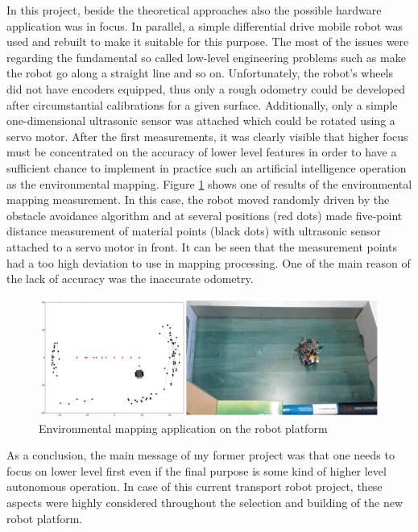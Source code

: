 \documentclass[12pt,english,twoside]{article}
\begin{document}
In this project, beside the theoretical approaches also the possible hardware application was in focus. In parallel, a simple differential drive mobile robot was used and rebuilt to make it suitable for this purpose. The most of the issues were regarding the fundamental so called low-level engineering problems such as make the robot go along a straight line and so on. Unfortunately, the robot's wheels did not have encoders equipped, thus only a rough odometry could be developed after circumstantial calibrations for a given surface. Additionally, only a simple one-dimensional ultrasonic sensor was attached which could be rotated using a servo motor. After the first measurements, it was clearly visible that higher focus must be concentrated on the accuracy of lower level features in order to have a sufficient chance to implement in practice such an artificial intelligence operation as the environmental mapping. Figure \ref{glimpse2} shows one of results of the environmental mapping measurement. In this case, the robot moved randomly driven by the obstacle avoidance algorithm and at several positions (red dots) made five-point distance measurement of material points (black dots) with ultrasonic sensor attached to a servo motor in front. It can be seen that the measurement points had a too high deviation to use in mapping processing. One of the main reason of the lack of accuracy was the inaccurate odometry.
\begin{figure}[h]
	\centering
	\includegraphics[width=\textwidth]{figures/glimpse2.png}
	\caption{Environmental mapping application on the robot platform}
	\label{glimpse2}
\end{figure}

As a conclusion, the main message of my former project was that one needs to focus on lower level first even if the final purpose is some kind of higher level autonomous operation. In case of this current transport robot project, these aspects were highly considered throughout the selection and building of the new robot platform.


\newpage
\end{document}
